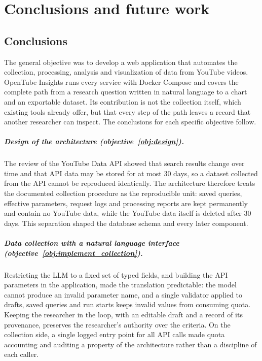 \chapter{Conclusions and future work}
\label{chap:conclusions}

\section{Conclusions}

The general objective was to develop a web application that automates the collection, processing, analysis and visualization of data from YouTube videos. OpenTube Insights runs every service with Docker Compose and covers the complete path from a research question written in natural language to a chart and an exportable dataset. Its contribution is not the collection itself, which existing tools already offer, but that every step of the path leaves a record that another researcher can inspect. The conclusions for each specific objective follow.

\paragraph{Design of the architecture (objective~\ref{obj:design}).} The review of the YouTube Data API showed that search results change over time and that API data may be stored for at most 30 days, so a dataset collected from the API cannot be reproduced identically. The architecture therefore treats the documented collection procedure as the reproducible unit: saved queries, effective parameters, request logs and processing reports are kept permanently and contain no YouTube data, while the YouTube data itself is deleted after 30 days. This separation shaped the database schema and every later component.

\paragraph{Data collection with a natural language interface (objective~\ref{obj:implement_collection}).} Restricting the LLM to a fixed set of typed fields, and building the API parameters in the application, made the translation predictable: the model cannot produce an invalid parameter name, and a single validator applied to drafts, saved queries and run starts keeps invalid values from consuming quota. Keeping the researcher in the loop, with an editable draft and a record of its provenance, preserves the researcher's authority over the criteria. On the collection side, a single logged entry point for all API calls made quota accounting and auditing a property of the architecture rather than a discipline of each caller.

